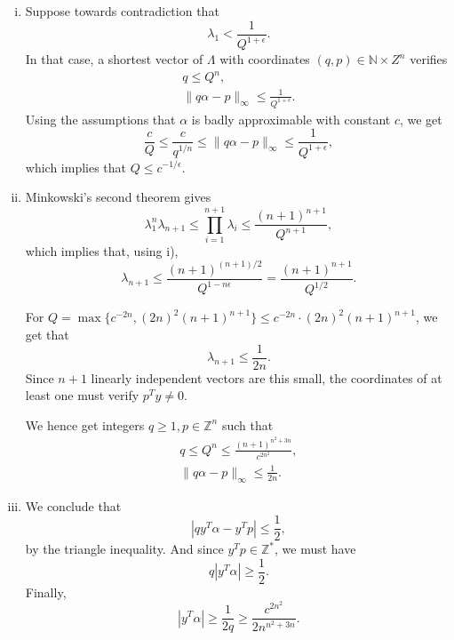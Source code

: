 \documentclass[12pt,a4paper]{article}
\theoremstyle{plain}
\theoremstyle{definition}
\def \N {\mathbb N}
\def \Z {\mathbb Z}
\begin{document}
{
	\begin{enumerate}[i)]
		\item Suppose towards contradiction that 
			\[ \lambda_1 < \frac{1}{Q^{1+\epsilon}}. \]
		In that case, a shortest vector of $\Lambda$ with coordinates $(q, p) \in \N \times Z^n$ verifies
			\begin{gather*}
				q \leq Q^n, \\
				\| q \alpha - p \|_\infty \leq \frac{1}{Q^{1+\epsilon}}.
			\end{gather*}
		Using the assumptions that $\alpha$ is badly approximable with constant $c$, we get
			\[ \frac{c}{Q} \leq \frac{c}{q^{1/n}} \leq \| q \alpha - p \|_\infty \leq \frac{1}{Q^{1+\epsilon}}, \]
		which implies that $Q \leq c^{-1/\epsilon}$.

		\item Minkowski's second theorem gives
			\[ \lambda_1^n \lambda_{n+1} \leq \prod_{i=1}^{n+1} \lambda_i \leq \frac{(n+1)^{n+1}}{Q^{n+1}}, \]
		which implies that, using i),
			\[ \lambda_{n+1} \leq \frac{(n+1)^{(n+1)/2}}{Q^{1-n\epsilon}} = \frac{(n+1)^{n+1}}{Q^{1/2}}. \] 

		For $Q = \max\{ c^{-2n}, (2n)^2 (n+1)^{n+1}\} \leq c^{-2n} \cdot (2n)^2 (n+1)^{n+1}$, we get that 
			\[ \lambda_{n+1} \leq \frac1{2n}. \]
		Since $n+1$ linearly independent vectors are this small, the coordinates of at least one must verify $p^T y \neq 0$.
		
		We hence get integers $q \geq 1, p \in \Z^n$ such that
			\begin{gather*}
				q \leq Q^n \leq \frac{(n+1)^{n^2 +3n}}{c^{2n^2}}, \\
				\| q \alpha - p \|_\infty \leq \frac1{2n}.
			\end{gather*}

		\item We conclude that
			\[ | q y^T \alpha - y^T p | \leq \frac12, \]
		by the triangle inequality. And since $y^Tp \in \Z^*$, we must have
			\[ q | y^T \alpha | \geq \frac12. \]
		Finally,
			\[ | y^T \alpha | \geq \frac1{2q} \geq \frac{c^{2n^2}}{2n^{n^2+3n}}. \]
	\end{enumerate}


}
\end{document}
